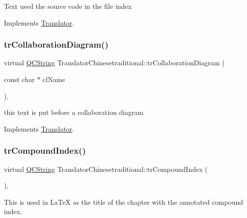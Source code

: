 Text used the source code in the file index 

Implements \mbox{\hyperlink{class_translator}{Translator}}.

\mbox{\label{class_translator_chinesetraditional_a3339f96a2c8696dba9dfb553df59050e}} 
\subsubsection{\texorpdfstring{trCollaborationDiagram()}{trCollaborationDiagram()}}
{\footnotesize\ttfamily virtual \mbox{\hyperlink{class_q_c_string}{Q\+C\+String}} Translator\+Chinesetraditional\+::tr\+Collaboration\+Diagram (\begin{DoxyParamCaption}\item[{const char $\ast$}]{cl\+Name }\end{DoxyParamCaption})\hspace{0.3cm}{\ttfamily [inline]}, {\ttfamily [virtual]}}

this text is put before a collaboration diagram 

Implements \mbox{\hyperlink{class_translator}{Translator}}.

\mbox{\label{class_translator_chinesetraditional_a7dc1fe9022bd659c8b0e8ed6b659c4ff}} 
\subsubsection{\texorpdfstring{trCompoundIndex()}{trCompoundIndex()}}
{\footnotesize\ttfamily virtual \mbox{\hyperlink{class_q_c_string}{Q\+C\+String}} Translator\+Chinesetraditional\+::tr\+Compound\+Index (\begin{DoxyParamCaption}{ }\end{DoxyParamCaption})\hspace{0.3cm}{\ttfamily [inline]}, {\ttfamily [virtual]}}

This is used in La\+TeX as the title of the chapter with the annotated compound index. 

